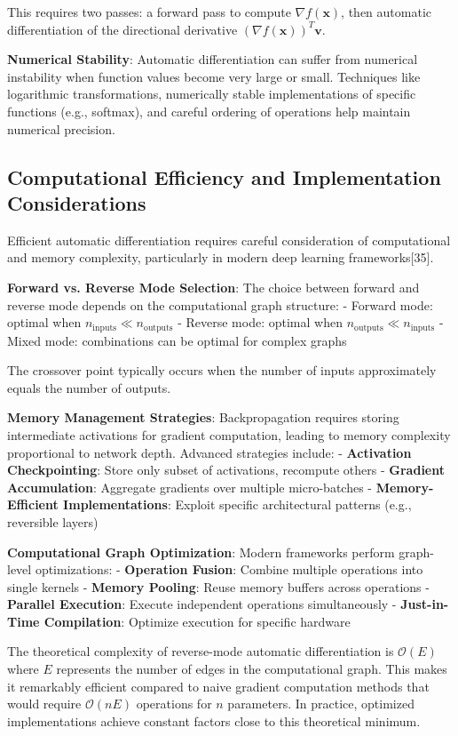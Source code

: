 \documentclass[11pt,a4paper]{report}
\begin{document}
This requires two passes: a forward pass to compute $\nabla f(\mathbf{x})$, then automatic differentiation of the directional derivative $(\nabla f(\mathbf{x}))^T \mathbf{v}$.

\textbf{Numerical Stability}: Automatic differentiation can suffer from numerical instability when function values become very large or small. Techniques like logarithmic transformations, numerically stable implementations of specific functions (e.g., softmax), and careful ordering of operations help maintain numerical precision.

\subsection{Computational Efficiency and Implementation Considerations}

Efficient automatic differentiation requires careful consideration of computational and memory complexity, particularly in modern deep learning frameworks[35].

\textbf{Forward vs. Reverse Mode Selection}: The choice between forward and reverse mode depends on the computational graph structure:
- Forward mode: optimal when $n_{\text{inputs}} \ll n_{\text{outputs}}$
- Reverse mode: optimal when $n_{\text{outputs}} \ll n_{\text{inputs}}$  
- Mixed mode: combinations can be optimal for complex graphs

The crossover point typically occurs when the number of inputs approximately equals the number of outputs.

\textbf{Memory Management Strategies}: Backpropagation requires storing intermediate activations for gradient computation, leading to memory complexity proportional to network depth. Advanced strategies include:
- \textbf{Activation Checkpointing}: Store only subset of activations, recompute others
- \textbf{Gradient Accumulation}: Aggregate gradients over multiple micro-batches
- \textbf{Memory-Efficient Implementations}: Exploit specific architectural patterns (e.g., reversible layers)

\textbf{Computational Graph Optimization}: Modern frameworks perform graph-level optimizations:
- \textbf{Operation Fusion}: Combine multiple operations into single kernels
- \textbf{Memory Pooling}: Reuse memory buffers across operations  
- \textbf{Parallel Execution}: Execute independent operations simultaneously
- \textbf{Just-in-Time Compilation}: Optimize execution for specific hardware

The theoretical complexity of reverse-mode automatic differentiation is $\mathcal{O}(E)$ where $E$ represents the number of edges in the computational graph. This makes it remarkably efficient compared to naive gradient computation methods that would require $\mathcal{O}(nE)$ operations for $n$ parameters. In practice, optimized implementations achieve constant factors close to this theoretical minimum.
\end{document}
